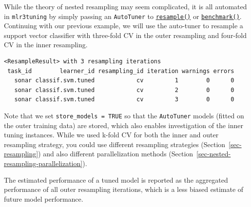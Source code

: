 While the theory of nested resampling may seem complicated, it is all
automated in \texttt{mlr3tuning} by simply passing an \texttt{AutoTuner}
to
\href{https://mlr3.mlr-org.com/reference/resample.html}{\texttt{resample()}}
or
\href{https://mlr3.mlr-org.com/reference/benchmark.html}{\texttt{benchmark()}}.
Continuing with our previous example, we will use the auto-tuner to
resample a support vector classifier with three-fold CV in the outer
resampling and four-fold CV in the inner resampling.

\begin{Shaded}
\begin{Highlighting}[]
\OtherTok{=} \NormalTok{(}
   \NormalTok{(}\NormalTok{, } \NormalTok{),}
\NormalTok{)}

\OtherTok{=}  \NormalTok{)}

\end{Highlighting}
\end{Shaded}

\begin{verbatim}
<ResampleResult> with 3 resampling iterations
 task_id        learner_id resampling_id iteration warnings errors
   sonar classif.svm.tuned            cv         1        0      0
   sonar classif.svm.tuned            cv         2        0      0
   sonar classif.svm.tuned            cv         3        0      0
\end{verbatim}

Note that we set \texttt{store\_models\ =\ TRUE} so that the
\texttt{AutoTuner} models (fitted on the outer training data) are
stored, which also enables investigation of the inner tuning instances.
While we used k-fold CV for both the inner and outer resampling
strategy, you could use different resampling strategies
(Section~\ref{sec-resampling}) and also different parallelization
methods (Section~\ref{sec-nested-resampling-parallelization}).

The estimated performance of a tuned model is reported as the aggregated
performance of all outer resampling iterations, which is a less biased
estimate of future model performance.

